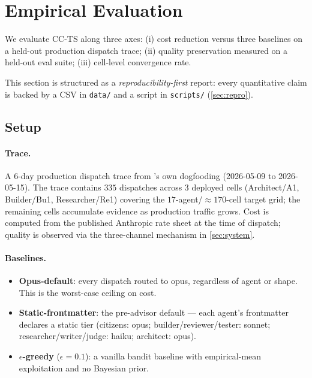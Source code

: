\section{Empirical Evaluation}
\label{sec:eval}

We evaluate CC-TS along three axes: (i) cost reduction versus three
baselines on a held-out production dispatch trace; (ii) quality
preservation measured on a held-out eval suite; (iii) cell-level
convergence rate.

This section is structured as a \emph{reproducibility-first} report: every
quantitative claim is backed by a CSV in \texttt{data/} and a script in
\texttt{scripts/} (\cref{sec:repro}).

\subsection{Setup}

\paragraph{Trace.}
A $6$-day production dispatch trace from \blackrim's own
dogfooding (2026-05-09 to 2026-05-15). The trace contains $335$ dispatches
across $3$ deployed cells (Architect/A1, Builder/Bu1, Researcher/Re1)
covering the $17$-agent/$\approx 170$-cell target grid; the remaining cells
accumulate evidence as production traffic grows. Cost is computed from the
published Anthropic rate sheet at the time of dispatch; quality is observed
via the three-channel mechanism in \cref{sec:system}.

\paragraph{Baselines.}
\begin{itemize}[leftmargin=*]
  \item \textbf{Opus-default}: every dispatch routed to opus, regardless
        of agent or shape. This is the worst-case ceiling on cost.
  \item \textbf{Static-frontmatter}: the pre-advisor \blackrim default ---
        each agent's frontmatter declares a static tier
        (citizens: opus; builder/reviewer/tester: sonnet;
        researcher/writer/judge: haiku; architect: opus).
  \item \textbf{$\epsilon$-greedy} ($\epsilon = 0.1$): a vanilla bandit
        baseline with empirical-mean exploitation and no Bayesian prior.
\end{itemize}

